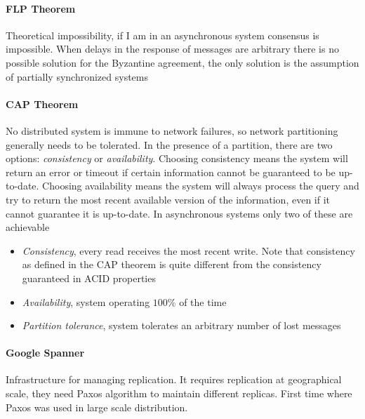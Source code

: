 \paragraph{FLP Theorem}
Theoretical impossibility, if I am in an asynchronous system consensus is impossible. When delays in the response of messages are arbitrary there is no possible
solution for the Byzantine agreement, the only solution is the assumption of partially synchronized systems

\paragraph{CAP Theorem}
No distributed system is immune to network failures, so network partitioning generally needs to be tolerated. In the presence of a partition, there are two options: \textit{consistency} or \textit{availability}. Choosing consistency means the system will return an error or timeout if certain information cannot be guaranteed to be up-to-date. Choosing availability means the system will always process the query and try to return the most recent available version of the information, even if it cannot guarantee it is up-to-date. In asynchronous systems only two of these are achievable

\begin{itemize}
    \item \textit{Consistency}, every read receives the most recent write. Note that consistency as defined in the CAP theorem is quite different from the consistency guaranteed in ACID properties
    \item \textit{Availability}, system operating $100\%$ of the time
    \item \textit{Partition tolerance}, system tolerates an arbitrary number of lost messages
\end{itemize}

\paragraph{Google Spanner}
Infrastructure for managing replication. It requires replication at geographical scale, they need Paxos algorithm to maintain different replicas. First time where Paxos was used in large scale distribution.

